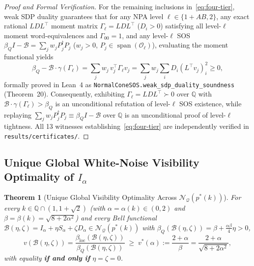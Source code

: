 \documentclass[11pt,a4paper]{article}
\newtheorem{theorem}{Theorem}[section]
\newcommand{\QQ}{\mathbb{Q}}
\newcommand{\calN}{\mathcal{N}_{\mathcal{Q}}}
\newcommand{\calB}{\mathcal{B}}
\begin{document}
\begin{proof}[Proof and Formal Verification]
For the remaining inclusions in~\eqref{eq:four-tier}, weak SDP duality guarantees that for any NPA level $\ell \in \{1+AB, 2\}$, any exact rational $LDL^\top$ moment matrix $\Gamma_\ell = L D L^\top$ ($D_i > 0$) satisfying all level-$\ell$ moment word-equivalences and $\Gamma_{00} = 1$, and any level-$\ell$ SOS $\beta_Q I - \calB = \sum_j w_j P_j^\dagger P_j$ ($w_j > 0$, $P_j \in \operatorname{span}(\mathcal{O}_\ell)$), evaluating the moment functional yields
\begin{equation}
  \beta_Q - \calB\cdot\gamma(\Gamma_\ell) = \sum_j w_j\, v_j^\top \Gamma_\ell v_j = \sum_j w_j \sum_i D_i (L^\top v_j)_i^2 \ge 0,
  \label{eq:weak-duality}
\end{equation}
formally proved in Lean~4 as \texttt{NormalConeSOS.weak\_sdp\_duality\_soundness} (Theorem~20).
Consequently, exhibiting $\Gamma_\ell = L D L^\top \succ 0$ over $\QQ$ with $\calB\cdot\gamma(\Gamma_\ell) > \beta_Q$ is an unconditional refutation of level-$\ell$ SOS existence, while replaying $\sum_j w_j P_j^\dagger P_j \equiv \beta_Q I - \calB$ over $\QQ$ is an unconditional proof of level-$\ell$ tightness. All 13 witnesses establishing~\eqref{eq:four-tier} are independently verified in \texttt{results/certificates/}.
\end{proof}

\subsection{Unique Global White-Noise Visibility Optimality of \texorpdfstring{$I_\alpha$}{I\_alpha}}

\begin{theorem}[Unique Global Visibility Optimality Across $\calN(p^*(k))$]
\label{thm:visibility}
For every $k \in \QQ \cap (1, 1+\sqrt{2})$ (with $\alpha = \alpha(k) \in (0,2)$ and $\beta = \beta(k) = \sqrt{8+2\alpha^2}$) and every Bell functional $\calB(\eta,\zeta) = I_\alpha + \eta S_\alpha + \zeta D_\alpha \in \calN(p^*(k))$ with $\beta_Q(\calB(\eta,\zeta)) = \beta + \frac{\alpha\beta}{4}\eta > 0$,
\begin{equation}
  v(\calB(\eta,\zeta)) = \frac{\beta_{\mathrm{loc}}(\calB(\eta,\zeta))}{\beta_Q(\calB(\eta,\zeta))} \;\ge\; v^*(\alpha) := \frac{2+\alpha}{\beta} = \frac{2+\alpha}{\sqrt{8 + 2\alpha^2}},
  \label{eq:vis-bound}
\end{equation}
with equality \textbf{if and only if} $\eta = \zeta = 0$.
\end{theorem}
\end{document}
